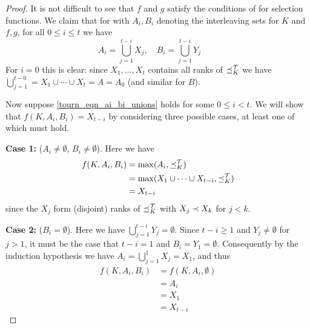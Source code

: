 \begin{proof}
    It is not difficult to see that $f$ and $g$ satisfy the conditions of
     for selection functions. We claim that for
    with $A_i, B_i$ denoting the interleaving sets for $K$ and $f, g$, for
    all $0 \le i \le t$ we have
    \begin{equation}
        \label{tourn_eqn_ai_bi_unions}
        A_i = \bigcup_{j=1}^{t - i}{X_j},
        \quad
        B_i = \bigcup_{j=1}^{t - i}{Y_j}
        \quad
        \quad
    \end{equation}
    For $i = 0$ this is clear: since $X_1,\ldots,X_t$ contains all ranks of
    ${\preceq_K^{\mathcal{T}}}$ we have $\bigcup_{j=1}^{t-0} = X_1 \cup \cdots \cup X_t = A
    = A_0$ (and similar for $B$).

    Now suppose \cref{tourn_eqn_ai_bi_unions} holds for some $0 \le i < t$. We
    will show that $f(K, A_i, B_i) = X_{t-i}$ by considering three possible
    cases, at least one of which must hold.

    \textbf{Case 1:} ($A_i \ne \emptyset$, $B_i \ne \emptyset$). Here we have
    \begin{align*}
        f(K, A_i, B_i)
        &= \max(A_i, {\preceq_K^{\mathcal{T}}}) \\
        &= \max(X_1 \cup \cdots \cup X_{t-i}, {\preceq_K^{\mathcal{T}}}) \\
        &= X_{t-i}
    \end{align*}
    since the $X_j$ form (disjoint) ranks of ${\preceq_K^{\mathcal{T}}}$ with $X_{j} \prec
    X_{k}$ for $j < k$.

    \textbf{Case 2:} ($B_i = \emptyset$). Here we have
    $\bigcup_{j=1}^{t-i}{Y_j} = \emptyset$. Since $t - i \ge 1$ and $Y_j \ne
    \emptyset$ for $j > 1$, it must be the case that $t - i = 1$ and $B_i = Y_1
    = \emptyset$. Consequently by the induction hypothesis we have $A_i =
    \bigcup_{j=1}^{1}{X_j} = X_1$, and thus
    \begin{align*}
        f(K, A_i, B_i)
        &= f(K, A_i, \emptyset) \\
        &= A_i \\
        &= X_1 \\
        &= X_{t-i}
    \end{align*}


\end{proof}
